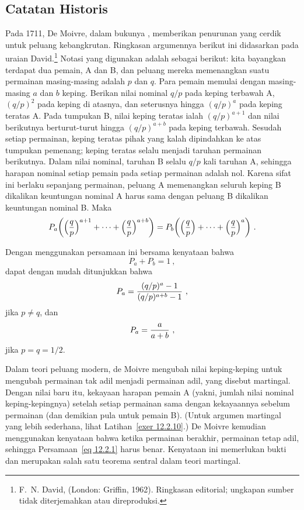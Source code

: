 \subsection*{Catatan Historis}

Pada 1711, De Moivre, dalam bukunya ,
memberikan penurunan yang cerdik untuk peluang kebangkrutan. Ringkasan argumennya
berikut ini didasarkan pada uraian David.\footnote{F.~N. David,
 (London: Griffin, 1962). Ringkasan editorial;
ungkapan sumber tidak diterjemahkan atau direproduksi.}
Notasi yang digunakan adalah sebagai berikut: kita bayangkan terdapat dua
pemain, A dan B, dan peluang mereka memenangkan suatu permainan masing-masing
adalah $p$ dan $q$. Para pemain memulai dengan masing-masing $a$ dan $b$ keping.
Berikan nilai nominal $q/p$ pada keping terbawah A, $(q/p)^2$ pada keping di
atasnya, dan seterusnya hingga $(q/p)^a$ pada keping teratas A. Pada tumpukan B,
nilai keping teratas ialah $(q/p)^{a+1}$ dan nilai berikutnya berturut-turut
hingga $(q/p)^{a+b}$ pada keping terbawah. Sesudah setiap permainan, keping
teratas pihak yang kalah dipindahkan ke atas tumpukan pemenang; keping teratas
selalu menjadi taruhan permainan berikutnya. Dalam nilai nominal, taruhan B
selalu $q/p$ kali taruhan A, sehingga harapan nominal setiap pemain pada setiap
permainan adalah nol. Karena sifat ini berlaku sepanjang permainan, peluang A
memenangkan seluruh keping B dikalikan keuntungan nominal A harus sama dengan
peluang B dikalikan keuntungan nominal B. Maka
\begin{equation}
P_a\biggl(\Bigl({q\over p}\Bigr)^{a+1} + \cdots +
\Bigl({q\over p}\Bigr)^{a+b}\biggr) =  
P_b\biggl(\Bigl({q\over p}\Bigr) + \cdots +
\Bigl({q\over p}\Bigr)^a\biggr)\ .
\label{eq 12.2.1}
\end{equation}
\par
Dengan menggunakan persamaan ini bersama kenyataan bahwa
$$P_a + P_b = 1\ ,$$
dapat dengan mudah ditunjukkan bahwa
$$P_a = {{(q/p)^a - 1}\over{(q/p)^{a+b} - 1}}\ ,$$
jika $p \ne q$, dan
$$P_a = {a\over{a+b}}\ ,$$
jika $p = q = 1/2$.
\par
Dalam teori peluang modern, de Moivre mengubah nilai keping-keping untuk
mengubah permainan tak adil menjadi permainan adil, yang disebut martingal.
Dengan nilai baru itu, kekayaan harapan pemain A (yakni, jumlah nilai nominal
keping-kepingnya) setelah setiap permainan sama dengan kekayaannya sebelum
permainan (dan demikian pula untuk pemain B). (Untuk argumen martingal yang lebih
sederhana, lihat Latihan~\ref{exer 12.2.10}.) De Moivre kemudian menggunakan
kenyataan bahwa ketika permainan berakhir, permainan tetap adil, sehingga
Persamaan~\ref{eq 12.2.1} harus benar. Kenyataan ini memerlukan bukti dan
merupakan salah satu teorema sentral dalam teori martingal.  

